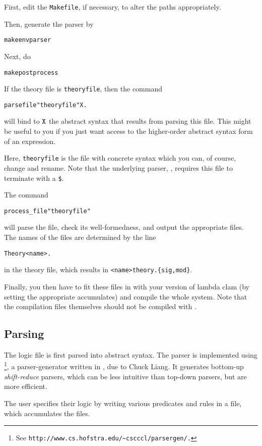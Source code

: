 First, edit the {\tt Makefile}, if necessary, to alter the paths appropriately.

Then, generate the parser by
\begin{alltt}
make envparser
\end{alltt}
Next, do
\begin{alltt}
make postprocess
\end{alltt}

If the theory file is {\tt theoryfile}, then the command
\begin{alltt}
parsefile "theoryfile" X.
\end{alltt}
will bind to $\tt X$ the abstract syntax that results from parsing
this file. This might be useful to you if you just want access to the
higher-order abstract syntax form of an expression.

Here, {\tt theoryfile} is the file with concrete syntax which you can,
of course, change and rename. Note that the underlying parser, \lyacc,
requires this file to terminate with a {\tt \$}.

The command
\begin{alltt}
process_file "theoryfile"
\end{alltt}
will parse the file, check its well-formedness, and output the
appropriate \lclam files. The names of the files are determined by
the line
\begin{alltt}
Theory <name>.
\end{alltt}
in the theory file, which results in {\tt <name>theory.\{sig,mod\}}. 

Finally, you then have to fit these files in with your version of
lambda clam (by setting the appropriate accumulates) and compile the
whole system. Note that the compilation files themselves should not be
compiled with \lclam.


\subsection{Parsing}\label{parsing}

The logic file is first parsed into abstract syntax. The parser is
implemented using 
\lyacc\footnote{See {\tt http://www.cs.hofstra.edu/\~{ }cscccl/parsergen/.}}, 
a parser-generator written in \lprolog, due to Chuck Liang. It
generates bottom-up {\em shift-reduce} parsers, which can be less
intuitive than top-down parsers, but are more efficient.

The user specifies their logic by writing various predicates and rules
in a \lprolog file, which accumulates the \lyacc files.

